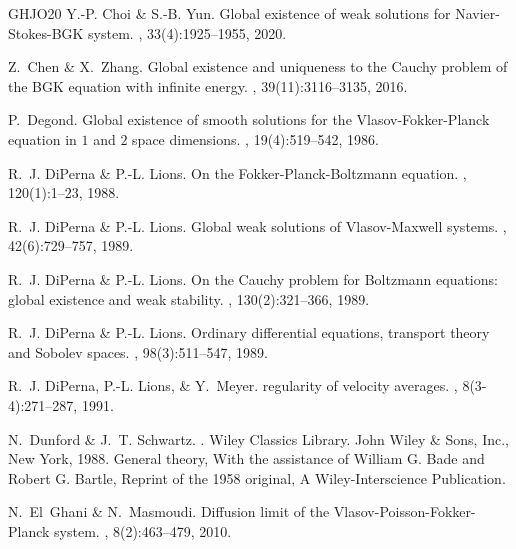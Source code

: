 \documentclass[10pt, reqno]{amsart}
\theoremstyle{plain}
\theoremstyle{definition}
\theoremstyle{remark}
\numberwithin{equation}{section}
\begin{document}
\begin{thebibliography}{GHJO20}
{\sc Y.-P. Choi \& S.-B. Yun.}
\newblock Global existence of weak solutions for {N}avier-{S}tokes-{BGK} system.
, 33(4):1925--1955, 2020.

{\sc Z.~Chen \& X.~Zhang.}
\newblock Global existence and uniqueness to the {C}auchy problem of the {BGK} equation with infinite energy.
, 39(11):3116--3135, 2016.

{\sc P.~Degond.}
\newblock Global existence of smooth solutions for the
  {V}lasov-{F}okker-{P}lanck equation in {$1$} and {$2$} space dimensions.
, 19(4):519--542, 1986.

{\sc R.~J. DiPerna \& P.-L. Lions.}
\newblock On the {F}okker-{P}lanck-{B}oltzmann equation.
, 120(1):1--23, 1988.

{\sc R.~J. DiPerna \& P.-L. Lions.}
\newblock Global weak solutions of {V}lasov-{M}axwell systems.
, 42(6):729--757, 1989.

{\sc R.~J. DiPerna \& P.-L. Lions.}
\newblock On the {C}auchy problem for {B}oltzmann equations: global existence and weak stability.
, 130(2):321--366, 1989.

{\sc R.~J. DiPerna \& P.-L. Lions.}
\newblock Ordinary differential equations, transport theory and {S}obolev spaces.
, 98(3):511--547, 1989.

{\sc R.~J. DiPerna, P.-L. Lions, \& Y.~Meyer.}
 regularity of velocity averages.
, 8(3-4):271--287, 1991.

{\sc N.~Dunford \& J.~T. Schwartz.}
.
\newblock Wiley Classics Library. John Wiley \& Sons, Inc., New York, 1988.
\newblock General theory, With the assistance of William G. Bade and Robert G. Bartle, Reprint of the 1958 original, A Wiley-Interscience Publication.

{\sc N.~El~Ghani \& N.~Masmoudi.}
\newblock Diffusion limit of the {V}lasov-{P}oisson-{F}okker-{P}lanck system.
, 8(2):463--479, 2010.


\end{thebibliography}
\end{document}
